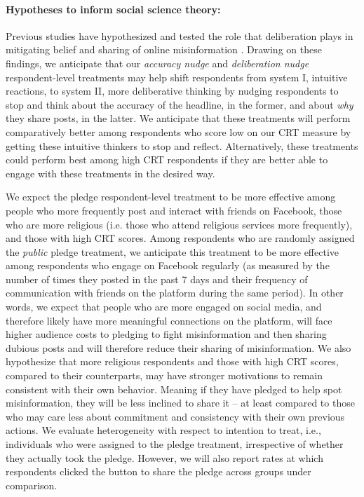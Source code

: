 \documentclass[letterpaper, 12pt, parskip=full,DIV=10]{scrartcl}
\begin{document}
\paragraph{Hypotheses to inform social science theory:} Previous studies have hypothesized and tested the role that deliberation plays in mitigating belief and sharing of online misinformation \citep{bago2020fake,pennycook2020fighting}. Drawing on these findings, we anticipate that our \textit{accuracy nudge} and \textit{deliberation nudge} respondent-level treatments may help shift respondents from system I, intuitive reactions, to system II, more deliberative thinking by nudging respondents to stop and think about the accuracy of the headline, in the former, and about \textit{why} they share posts, in the latter. We anticipate that these treatments will perform comparatively better among respondents who score low on our CRT measure by getting these intuitive thinkers to stop and reflect. Alternatively, these treatments could perform best among high CRT respondents if they are better able to engage with these treatments in the desired way. 


We expect the pledge respondent-level treatment to be more effective among people who more frequently post and interact with friends on Facebook, those who are more religious (i.e. those who attend religious services more frequently), and those with high CRT scores. Among respondents who are randomly assigned the \textit{public} pledge treatment, we anticipate this treatment to be more effective among respondents who engage on Facebook regularly (as measured by the number of times they posted in the past 7 days and their frequency of communication with friends on the platform during the same period). In other words, we expect that people who are more engaged on social media, and therefore likely have more meaningful connections on the platform, will face higher audience costs to pledging to fight misinformation and then sharing dubious posts and will therefore reduce their sharing of misinformation. We also hypothesize that more religious respondents and those with high CRT scores, compared to their counterparts, may have stronger motivations to remain consistent with their own behavior. Meaning if they have pledged to help spot misinformation, they will be less inclined to share it -- at least compared to those who may care less about commitment and consistency with their own previous actions. We evaluate heterogeneity with respect to intention to treat, i.e., individuals who were assigned to the pledge treatment, irrespective of whether they actually took the pledge. However, we will also report rates at which respondents clicked the button to share the pledge across groups under comparison.
\end{document}
